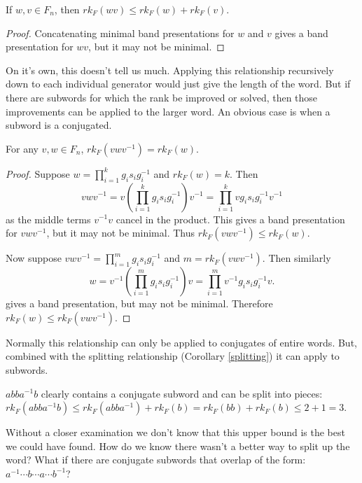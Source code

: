 \documentclass[12pt]{thesis}
\begin{document}
\begin{corollary}
    \label{splitting}
    If $w, v \in F_{n}$, then
    $rk_{F}(wv) \leq rk_{F}(w) + rk_{F}(v)$.
\end{corollary}

\begin{proof}
    Concatenating minimal band presentations for $w$ and $v$
    gives a band presentation for $wv$, but it may not be minimal.
\end{proof}

On it's own, this doesn't tell us much.
Applying this relationship recursively down to each individual generator would just give the length
of the word.
But if there are subwords for which the rank be improved or solved,
then those improvements can be applied to the larger word.
An obvious case is when a subword is a conjugated.

\begin{proposition}
    \label{conjugating}
    For any $v, w \in F_{n}$, $rk_{F}(vwv^{-1}) = rk_{F}(w)$.
\end{proposition}

\begin{proof}
    Suppose $w = \prod_{i=1}^{k} g_{i}s_{i}g_{i}^{-1}$
    and $rk_{F}(w) = k$.
    Then 
    \[
        vwv^{-1}  = v(\prod_{i=1}^{k} g_{i}s_{i}g_{i}^{-1})v^{-1} = \prod_{i=1}^{k} vg_{i}s_{i}g_{i}^{-1}v^{-1}
    \]
    as the middle terms $v^{-1}v$ cancel in the product.
    This gives a band presentation for $vwv^{-1}$,
    but it may not be minimal.
    Thus $rk_{F}(vwv^{-1}) \leq rk_{F}(w)$.

    Now suppose $vwv^{-1} = \prod_{i=1}^{m} g_{i}s_{i}g_{i}^{-1}$
    and $m = rk_{F}(vwv^{-1})$.
    Then similarly
    \[
        w = v^{-1}(\prod_{i=1}^{m} g_{i}s_{i}g_{i}^{-1})v = \prod_{i=1}^{m} v^{-1}g_{i}s_{i}g_{i}^{-1}v.
    \]
    gives a band presentation, but may not be minimal.
    Therefore $rk_{F}(w) \leq rk_{F}(vwv^{-1})$.
\end{proof}

Normally this relationship can only
be applied to conjugates of entire words. But, combined with the splitting relationship (Corollary \ref{splitting}) it can
apply to subwords.
\begin{example}
$a b b a^{-1} b$ clearly contains a conjugate subword and can be split into pieces:
$rk_{F}(a b b a^{-1} b) \leq rk_{F}(a b b a^{-1})  + rk_{F}(b) = rk_{F}(b b) + rk_{F}(b) \leq 2 + 1 = 3$. 
\end{example}

Without a closer examination we don't
know that this upper bound is the best we could have found.
How do we know there wasn't a better way to split up the word?
What if there are conjugate subwords that overlap of the form: $a^{-1} \cdots b \cdots a \cdots b^{-1}$?
\end{document}
